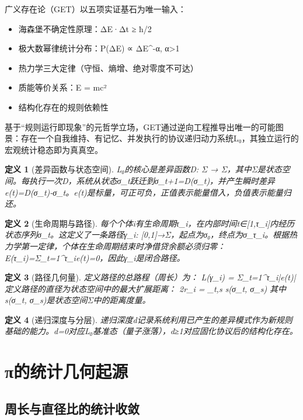 \documentclass[12pt, a4paper]{article}
\newtheorem{definition}{定义}[section]
\begin{document}
广义存在论（GET）以五项实证基石为唯一输入\cite{liang2025}：

\begin{itemize}
\item 海森堡不确定性原理：ΔE·Δt ≥ ħ/2
\item 极大数幂律统计分布：P(ΔE) ∝ ΔE^{-α}, α>1
\item 热力学三大定律（守恒、熵增、绝对零度不可达）
\item 质能等价关系：E = mc²
\item 结构化存在的规则依赖性
\end{itemize}

基于“规则运行即现象”的元哲学立场，GET通过逆向工程推导出唯一的可能图景：存在一个自我维持、有记忆、并发执行的协议递归动力系统L₀，其独立运行的宏观统计稳态即为真真空\cite{liang2025}。

\begin{definition}[差异函数与状态空间]
L₀的核心是差异函数D: Σ → Σ，其中Σ是状态空间。每执行一次D，系统从状态σ_t跃迁到σ_{t+1}=D(σ_t)，并产生瞬时差异e(t)=D(σ_t)-σ_t。e(t)是标量，可正可负，正值表示能量借入，负值表示能量归还。
\end{definition}

\begin{definition}[生命周期与路径]
每个个体i有生命周期τ_i，在内部时间t∈[1,τ_i]内经历状态序列{σ_t}。这定义了一条路径γ_i: [0,1]→Σ，起点为σ₀，终点为σ_{τ_i}。根据热力学第一定律，个体在生命周期结束时净借贷余额必须归零：E(τ_i)=Σ_{t=1}^{τ_i}e(t)=0，因此γ_i是闭合路径。
\end{definition}

\begin{definition}[路径几何量]
定义路径的总路程（周长）为：
L(γ_i) = Σ_{t=1}^{τ_i}|e(t)|
定义路径的直径为状态空间中的最大扩展距离：
2r_i = \max_{t,s} s(σ_t, σ_s)
其中s(σ_t, σ_s)是状态空间Σ中的距离度量。
\end{definition}

\begin{definition}[递归深度与分层]
递归深度d记录系统利用已产生的差异模式作为新规则基础的能力。d=0对应L₀基准态（量子涨落），d≥1对应固化协议后的结构化存在。
\end{definition}

\section{π的统计几何起源}

\subsection{周长与直径比的统计收敛}
\end{document}

